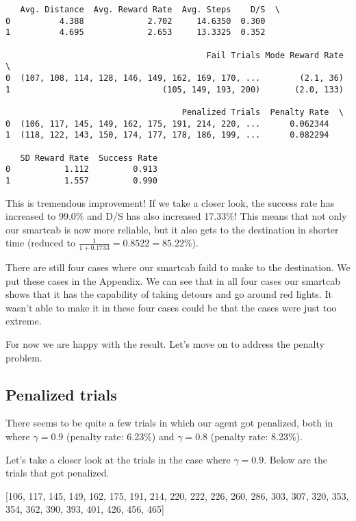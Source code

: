 \documentclass{article}
\begin{document}
    \begin{verbatim}
   Avg. Distance  Avg. Reward Rate  Avg. Steps    D/S  \
0          4.388             2.702     14.6350  0.300
1          4.695             2.653     13.3325  0.352

                                         Fail Trials Mode Reward Rate  \
0  (107, 108, 114, 128, 146, 149, 162, 169, 170, ...        (2.1, 36)
1                               (105, 149, 193, 200)       (2.0, 133)

                                    Penalized Trials  Penalty Rate  \
0  (106, 117, 145, 149, 162, 175, 191, 214, 220, ...      0.062344
1  (118, 122, 143, 150, 174, 177, 178, 186, 199, ...      0.082294

   SD Reward Rate  Success Rate
0           1.112         0.913
1           1.557         0.990
    \end{verbatim}


    This is tremendous improvement! If we take a closer look, the success
rate has increased to 99.0\% and D/S has also increased 17.33\%! This
means that not only our smartcab is now more reliable, but it also gets
to the destination in shorter time (reduced to
\(\frac{1}{1 + 0.1733} = 0.8522 = 85.22\%\)).

There are still four cases where our smartcab faild to make to the
destination. We put these cases in the Appendix. We can see that in all
four cases our smartcab shows that it has the capability of taking
detours and go around red lights. It wasn't able to make it in these
four cases could be that the cases were just too extreme.

For now we are happy with the result. Let's move on to address the
penalty problem.

\subsection{Penalized trials}\label{penalized-trials}

There seems to be quite a few trials in which our agent got penalized,
both in where \(\gamma = 0.9\) (penalty rate: 6.23\%) and
\(\gamma = 0.8\) (penalty rate: 8.23\%).

Let's take a closer look at the trials in the case where
\(\gamma = 0.9\). Below are the trials that got penalized.

{[}106, 117, 145, 149, 162, 175, 191, 214, 220, 222, 226, 260, 286, 303,
307, 320, 353, 354, 362, 390, 393, 401, 426, 456, 465{]}
\end{document}
